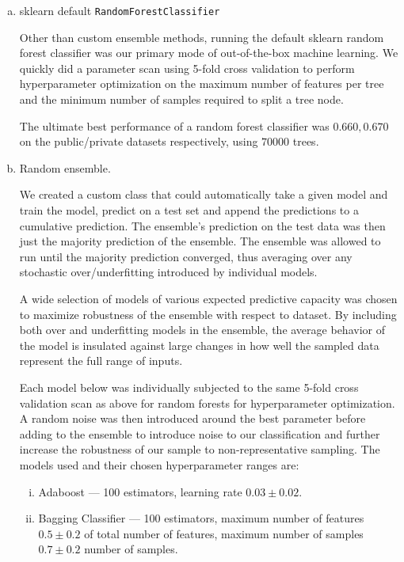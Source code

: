\documentclass[10pt]{article}
\begin{document}
\begin{enumerate}[a)]
    \item sklearn default \texttt{RandomForestClassifier}

        Other than custom ensemble methods, running the default sklearn random forest classifier was our primary mode of out-of-the-box machine learning. We quickly did a parameter scan using 5-fold cross validation to perform hyperparameter optimization on the maximum number of features per tree and the minimum number of samples required to split a tree node.

        The ultimate best performance of a random forest classifier was $0.660, 0.670$ on the public/private datasets respectively, using $70000$ trees.
    \item Random ensemble.

        We created a custom class that could automatically take a given model and train the model, predict on a test set and append the predictions to a cumulative prediction. The ensemble's prediction on the test data was then just the majority prediction of the ensemble. The ensemble was allowed to run until the majority prediction converged, thus averaging over any stochastic over/underfitting introduced by individual models.

        A wide selection of models of various expected predictive capacity was chosen to maximize robustness of the ensemble with respect to dataset. By including both over and underfitting models in the ensemble, the average behavior of the model is insulated against large changes in how well the sampled data represent the full range of inputs. 
        
        Each model below was individually subjected to the same 5-fold cross validation scan as above for random forests for hyperparameter optimization. A random noise was then introduced around the best parameter before adding to the ensemble to introduce noise to our classification and further increase the robustness of our sample to non-representative sampling. The models used and their chosen hyperparameter ranges are:
        \begin{enumerate}[i.]
            \item Adaboost --- 100 estimators, learning rate $0.03 \pm 0.02$.

            \item Bagging Classifier --- 100 estimators, maximum number of features $0.5 \pm 0.2$ of total number of features, maximum number of samples $0.7 \pm 0.2$ number of samples.


\end{enumerate}
\end{enumerate}
\end{document}
